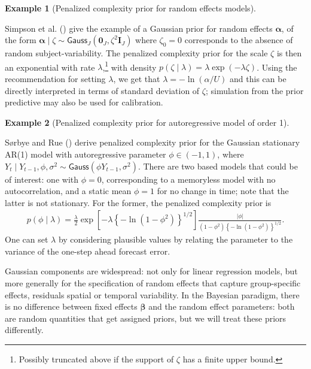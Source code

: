 \documentclass[
  11pt,
  letterpaper,
]{scrbook}
\theoremstyle{definition}
\theoremstyle{definition}
\newtheorem{example}{Example}[chapter]
\theoremstyle{definition}
\theoremstyle{plain}
\theoremstyle{plain}
\theoremstyle{remark}
\begin{document}
\begin{example}[Penalized complexity prior for random effects
models]\protect\hypertarget{exm-pcprior-randomeffect}{}\label{exm-pcprior-randomeffect}

Simpson et al. () give the example of a
Gaussian prior for random effects \(\boldsymbol{\alpha}\), of the form
\(\boldsymbol{\alpha} \mid \zeta \sim \mathsf{Gauss}_J(\boldsymbol{0}_J, \zeta^2 \mathbf{I}_J)\)
where \(\zeta_0=0\) corresponds to the absence of random
subject-variability. The penalized complexity prior for the scale
\(\zeta\) is then an exponential with rate \(\lambda\),\footnote{Possibly
  truncated above if the support of \(\zeta\) has a finite upper bound.}
with density \(p(\zeta \mid \lambda) = \lambda \exp(-\lambda \zeta)\).
Using the recommendation for setting \(\lambda\), we get that
\(\lambda = -\ln(\alpha/U)\) and this can be directly interpreted in
terms of standard deviation of \(\zeta\); simulation from the prior
predictive may also be used for calibration.

\end{example}

\begin{example}[Penalized complexity prior for autoregressive model of
order
1]\protect\hypertarget{exm-pcprior-arorder}{}\label{exm-pcprior-arorder}

Sørbye and Rue () derive penalized
complexity prior for the Gaussian stationary AR(1) model with
autoregressive parameter \(\phi \in (-1,1)\), where
\(Y_t \mid Y_{t-1}, \phi, \sigma^2 \sim \mathsf{Gauss}(\phi Y_{t-1}, \sigma^2)\).
There are two based models that could be of interest: one with
\(\phi=0\), corresponding to a memoryless model with no autocorrelation,
and a static mean \(\phi=1\) for no change in time; note that the latter
is not stationary. For the former, the penalized complexity prior is
\begin{align*}
p(\phi \mid \lambda) = \frac{\lambda}{2} \exp\left[-\lambda \left\{-\ln(1-\phi^2)\right\}^{1/2}\right] \frac{|\phi|}{(1-\phi^2)\left\{-\ln(1-\phi^2)\right\}^{1/2}}.
\end{align*} One can set \(\lambda\) by considering plausible values by
relating the parameter to the variance of the one-step ahead forecast
error.

\end{example}

Gaussian components are widespread: not only for linear regression
models, but more generally for the specification of random effects that
capture group-specific effects, residuals spatial or temporal
variability. In the Bayesian paradigm, there is no difference between
fixed effects \(\boldsymbol{\beta}\) and the random effect parameters:
both are random quantities that get assigned priors, but we will treat
these priors differently.
\end{document}
